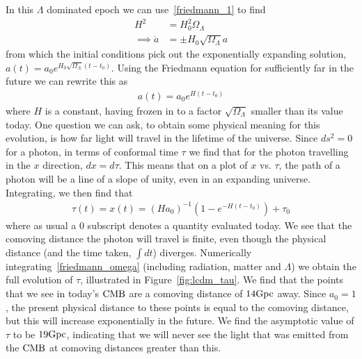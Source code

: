     In this $\Lambda$ dominated epoch we can use~\eqref{friedmann_1}
    to find
    \begin{align}
        H^2 &= H_0^2\Omega_{\Lambda}\\
        \implies \dot{a} &= \pm H_0\sqrt{\Omega_{\Lambda}}a
    \end{align}
    from which the initial conditions pick out the exponentially expanding solution,\\
    ${a(t)=a_0e^{H_0\sqrt{\Omega_{\Lambda}}\left(t-t_0\right)}}$. Using the Friedmann equation
    for sufficiently far in the future we can rewrite this as
    \begin{align}
        a(t)=a_0e^{H\left(t-t_0\right)}
    \end{align}
    where $H$ is a constant, having frozen in to a factor $\sqrt{\Omega_{\Lambda}}$ smaller than
    its value today.
    One question we can ask, to obtain some physical meaning for this evolution,
    is how far light will travel in the lifetime of the universe.
    Since $ds^2=0$ for a photon, in terms of conformal time $\tau$
    we find that for the photon travelling in the $x$ direction, $dx=d\tau$.
    This means that on a plot of $x$ vs. $\tau$, the path of a photon
    will be a line of a slope of unity, even in an expanding universe.
    Integrating, we then find that
    \begin{align}
        \tau(t)=x(t)=(Ha_0)^{-1}\left(1-e^{-H(t-t_0)}\right)+\tau_0
    \end{align}
    where as usual a $0$ subscript denotes a quantity evaluated today.
    We see that the comoving distance the photon will travel is finite, even though the physical
    distance (and the time taken, $\int dt$) diverges.
    Numerically integrating~\eqref{friedmann_omega}
    (including radiation, matter and $\Lambda$) we obtain the full evolution of $\tau$,
    illustrated in Figure~\ref{fig:lcdm_tau}.
    We find that the points that we see in today's $\text{CMB}$ are a comoving distance of $14\text{Gpc}$ away.
    Since $a_0=1$, the present physical distance to these points is equal to the comoving distance,
    but this will increase exponentially in the future.
    We find the asymptotic value of $\tau$ to be $19\text{Gpc}$, indicating that we will never see the
    light that was emitted from the $\text{CMB}$ at comoving distances greater than this.
